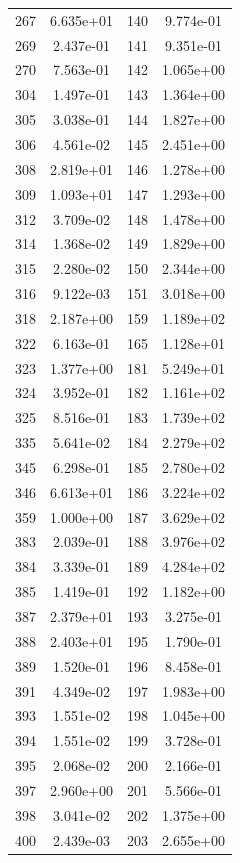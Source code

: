 \documentclass[12pt]{article}
\begin{document}
\begin{longtable}{@{}cccc@{}}
267 & 6.635e+01 & 140 & 9.774e-01 \\
269 & 2.437e-01 & 141 & 9.351e-01 \\
270 & 7.563e-01 & 142 & 1.065e+00 \\
304 & 1.497e-01 & 143 & 1.364e+00 \\
305 & 3.038e-01 & 144 & 1.827e+00 \\
306 & 4.561e-02 & 145 & 2.451e+00 \\
308 & 2.819e+01 & 146 & 1.278e+00 \\
309 & 1.093e+01 & 147 & 1.293e+00 \\
312 & 3.709e-02 & 148 & 1.478e+00 \\
314 & 1.368e-02 & 149 & 1.829e+00 \\
315 & 2.280e-02 & 150 & 2.344e+00 \\
316 & 9.122e-03 & 151 & 3.018e+00 \\
318 & 2.187e+00 & 159 & 1.189e+02 \\
322 & 6.163e-01 & 165 & 1.128e+01 \\
323 & 1.377e+00 & 181 & 5.249e+01 \\
324 & 3.952e-01 & 182 & 1.161e+02 \\
325 & 8.516e-01 & 183 & 1.739e+02 \\
335 & 5.641e-02 & 184 & 2.279e+02 \\
345 & 6.298e-01 & 185 & 2.780e+02 \\
346 & 6.613e+01 & 186 & 3.224e+02 \\
359 & 1.000e+00 & 187 & 3.629e+02 \\
383 & 2.039e-01 & 188 & 3.976e+02 \\
384 & 3.339e-01 & 189 & 4.284e+02 \\
385 & 1.419e-01 & 192 & 1.182e+00 \\
387 & 2.379e+01 & 193 & 3.275e-01 \\
388 & 2.403e+01 & 195 & 1.790e-01 \\
389 & 1.520e-01 & 196 & 8.458e-01 \\
391 & 4.349e-02 & 197 & 1.983e+00 \\
393 & 1.551e-02 & 198 & 1.045e+00 \\
394 & 1.551e-02 & 199 & 3.728e-01 \\
395 & 2.068e-02 & 200 & 2.166e-01 \\
397 & 2.960e+00 & 201 & 5.566e-01 \\
398 & 3.041e-02 & 202 & 1.375e+00 \\
400 & 2.439e-03 & 203 & 2.655e+00 \\

\end{longtable}
\end{document}
